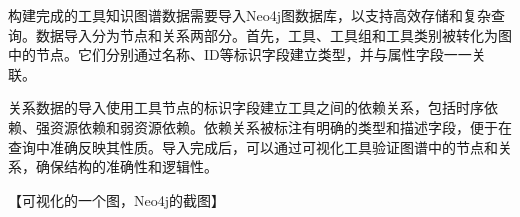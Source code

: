 构建完成的工具知识图谱数据需要导入Neo4j图数据库，以支持高效存储和复杂查询。数据导入分为节点和关系两部分。首先，工具、工具组和工具类别被转化为图中的节点。它们分别通过名称、ID等标识字段建立类型，并与属性字段一一关联。

关系数据的导入使用工具节点的标识字段建立工具之间的依赖关系，包括时序依赖、强资源依赖和弱资源依赖。依赖关系被标注有明确的类型和描述字段，便于在查询中准确反映其性质。导入完成后，可以通过可视化工具验证图谱中的节点和关系，确保结构的准确性和逻辑性。

【可视化的一个图，Neo4j的截图】










